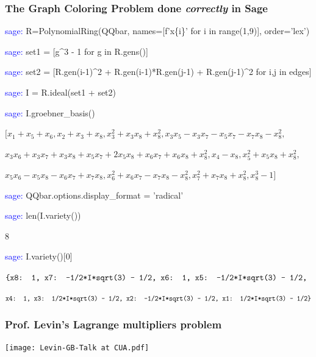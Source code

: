 \documentclass{beamer}
\begin{document}
\begin{frame}
\frametitle{The Graph Coloring Problem done {\it correctly} in Sage}
\begin{semiverbatim}
\scriptsize

\textcolor{blue}{sage:} R=PolynomialRing(QQbar, names=[f'x\{i\}' for i in range(1,9)], order='lex')

\textcolor{blue}{sage:} set1 = [g\^{}3 - 1 for g in R.gens()]

\textcolor{blue}{sage:} set2 = [R.gen(i-1)\^{}2 + R.gen(i-1)*R.gen(j-1) + R.gen(j-1)\^{}2 for i,j in edges]

\textcolor{blue}{sage:} I = R.ideal(set1 + set2)

\textcolor{blue}{sage:} I.groebner\_basis()


$[x_{1} + x_{5} + x_{6}, x_{2} + x_{3} + x_{8}, x_{3}^{2} + x_{3} x_{8} + x_{8}^{2}, x_{3} x_{5} - x_{3} x_{7} - x_{5} x_{7} - x_{7} x_{8} - x_{8}^{2},$

$x_{3} x_{6} + x_{3} x_{7} + x_{3} x_{8} + x_{5} x_{7} + 2 x_{5} x_{8} + x_{6} x_{7} + x_{6} x_{8} + x_{8}^{2}, x_{4} - x_{8}, x_{5}^{2} + x_{5} x_{8} + x_{8}^{2},$

$x_{5} x_{6} - x_{5} x_{8} - x_{6} x_{7} + x_{7} x_{8}, x_{6}^{2} + x_{6} x_{7} - x_{7} x_{8} - x_{8}^{2}, x_{7}^{2} + x_{7} x_{8} + x_{8}^{2}, x_{8}^{3} - 1]$


\textcolor{blue}{sage:} QQbar.options.display\_format = 'radical'

\textcolor{blue}{sage:} len(I.variety())

8

\textcolor{blue}{sage:} I.variety()[0]

$\texttt{{\char`\{}x8:{ }1, x7:{ }{-}1/2*I*sqrt(3){ }{-}{ }1/2, x6:{ }1,{ }x5:{ }{-}1/2*I*sqrt(3){ }{-}{ }1/2,{ }}$

$\texttt{x4:{ }1,{ }x3:{ }1/2*I*sqrt(3){ }{-}{ }1/2,{ }x2:{ }{-}1/2*I*sqrt(3){ }{-}{ }1/2,{ }x1:{ }1/2*I*sqrt(3){ }{-}{ }1/2{\char`\}}}$

\end{semiverbatim}


\end{frame}
\begin{frame}
\frametitle{Prof. Levin's Lagrange multipliers problem}
\texttt{[image: Levin-GB-Talk at CUA.pdf]}
\end{frame}
\end{document}
